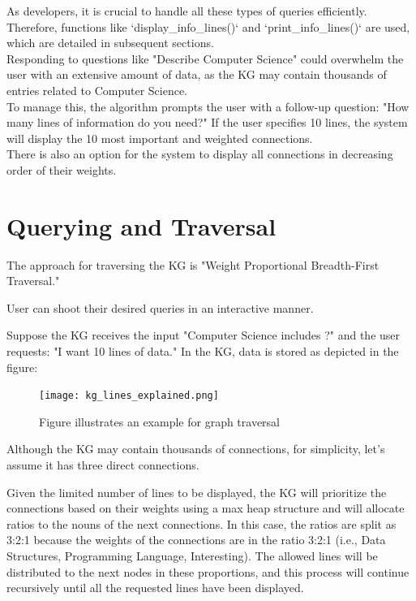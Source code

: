 \documentclass[conference]{IEEEtran}
\begin{document}
As developers, it is crucial to handle all these types of queries efficiently. Therefore, functions like `display\_info\_lines()` and `print\_info\_lines()` are used, which are detailed in subsequent sections.
\\

Responding to questions like "Describe Computer Science" could overwhelm the user with an extensive amount of data, as the KG may contain thousands of entries related to Computer Science. \\
To manage this, the algorithm prompts the user with a follow-up question: "How many lines of information do you need?" If the user specifies 10 lines, the system will display the 10 most important and weighted connections. 
\\
There is also an option for the system to display all connections in decreasing order of their weights.





\section{Querying and Traversal}


The approach for traversing the KG is "Weight Proportional Breadth-First 
Traversal."

User can shoot their desired queries in an interactive manner. 

Suppose the KG receives the input "Computer Science includes ?" and the user requests: "I want 10 lines of data."
In the KG, data is stored as depicted in the figure:

\begin{figure}[htbp]
\centering
\texttt{[image: kg\_lines\_explained.png]} %
\caption{Figure illustrates an example for graph traversal}
\label{fig}
\end{figure}



Although the KG may contain thousands of connections, for simplicity, let's assume it has three direct connections.

Given the limited number of lines to be displayed, the KG will prioritize the connections based on their weights using a max heap structure and will allocate ratios to the nouns of the next connections. In this case, the ratios are split as 
3:2:1 
because the weights of the connections are in the ratio 3:2:1 (i.e., Data Structures, Programming Language, Interesting). The allowed lines will be distributed to the next nodes in these proportions, and this process will continue recursively until all the requested lines have been displayed.
\end{document}
